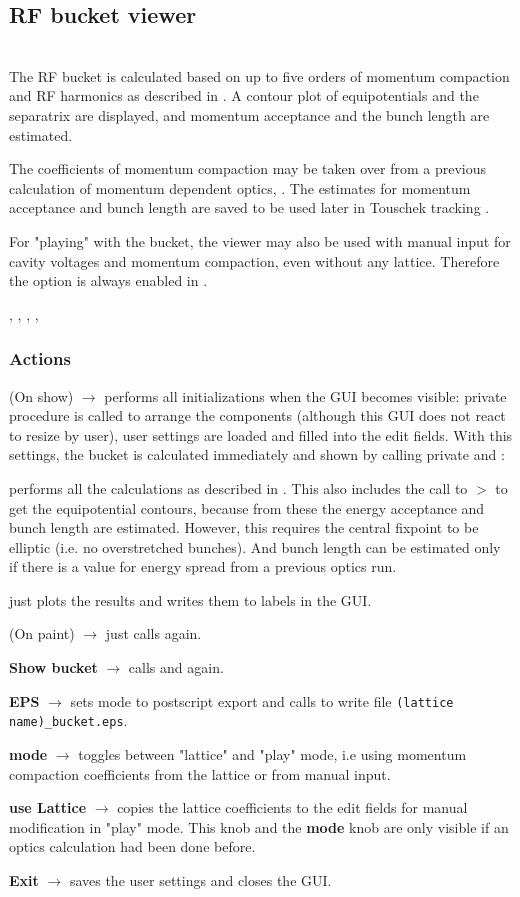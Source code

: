 \documentclass[12pt]{article}
\newcommand\code[1]{{\tt #1}}
\newcommand{\ofld}[1]{\colorbox{black!15}{{\bf #1}}}
\newcommand{\ofldx}[1]{\colorbox{black!15}{(#1)}}
\newcommand\guico[1]{{\color{blue}\code{#1}}}
\newcommand{\unico}[1]{{\color{burntorange}\code{#1}}}
\newcommand{\evcod}[2]{\ofld{#1} $\rightarrow$ \guico{#2}}
\newcommand{\evcodx}[2]{\ofldx{#1} $\rightarrow$ \guico{#2}}
\newcommand{\prcod}[2]{\opauni{#1}$>$\unico{#2}}
\newcommand{\opagui}[1]{\colorbox{blue!20}{{\color{black}\code{#1}}}}
\newcommand{\oguih}[2]{\subsection{\label{#2}#1}{\Huge\opagui{#2}}\\}
\newcommand{\ogui}[1]{\hyperref[#1]{\opagui{#1}}}
\newcommand{\opaguif}[1]{\colorbox{violet!30}{{\color{black}\code{#1}}}}
\newcommand{\oguif}[1]{\hyperref[#1]{\opaguif{#1}}}
\newcommand{\opauni}[1]{\colorbox{orange!30}{{\color{black}\code{#1}}}}
\newcommand{\ouni}[1]{\hyperref[#1]{\opauni{#1}}}
\newcommand{\uses}[1]{\flushleft {\bf Uses:} #1}
\newcommand{\desc}[1]{#1}
\newcommand{\act}[1]{\subsubsection*{Actions} #1}
\begin{document}
\oguih{RF bucket viewer}{opabucket}

\desc{
The RF bucket is calculated based on up to five orders of momentum compaction and RF harmonics as described in \cite{inside}. A contour plot of equipotentials and the separatrix are displayed, and momentum acceptance and the bunch length are estimated.

The coefficients of momentum compaction may be taken over from a previous calculation of momentum dependent optics, \ogui{opamomentum}. The estimates for momentum acceptance and bunch length are saved to be used later in Touschek tracking \ogui{opatracktt}.

For "playing" with the bucket, the viewer may also be used with manual input for cavity voltages and momentum compaction, even without any lattice. Therefore the option is always enabled in \ogui{opamenu}.
}

\uses{\ouni{globlib}, \ouni{mathlib}, \ouni{../com/conrect}, \oguif{../com/asfigure}, \ouni{../com/asaux}} 

\act{
\evcodx{On show}{FormShow} performs all initializations when the GUI becomes visible:  private procedure \guico{Layout} is called to arrange the components (although this GUI does not react to resize by user), user settings are loaded and filled into the edit fields. With this settings, the bucket is calculated immediately and shown by calling private \guico{CalcBucket} and \guico{MakePlot}:

\guico{CalcBucket} performs all the calculations as described in \cite{inside}. This also includes the call to \prcod{../com/concrect}{conrec} to get the equipotential contours, because from these the energy acceptance and bunch length are estimated. However, this requires the central fixpoint to be elliptic (i.e. no overstretched bunches). And bunch length can be estimated only if there is a value for energy spread from a previous optics run.

\guico{MakePlot} just plots the results and writes them to labels in the GUI.

\evcodx{On paint}{FormPaint} just calls \guico{MakePlot} again.

\evcod{Show bucket}{butconClick} calls \guico{CalcBucket} and \guico{MakePlot} again.

\evcod{EPS}{butepsClick} sets mode to postscript export and calls \guico{MakePlot} to write file \code{(lattice name)\_bucket.eps}.

\evcod{mode}{butmodClick} toggles between "lattice" and "play" mode, i.e using momentum compaction coefficients from the lattice or from manual input. 

\evcod{use Lattice}{butcopyClick} copies the lattice coefficients to the edit fields for manual modification in "play" mode. This knob and the \ofld{mode} knob are only visible if an optics calculation had been done before.

\evcod{Exit}{butexClick} saves the user settings and closes the GUI.
}
\end{document}
